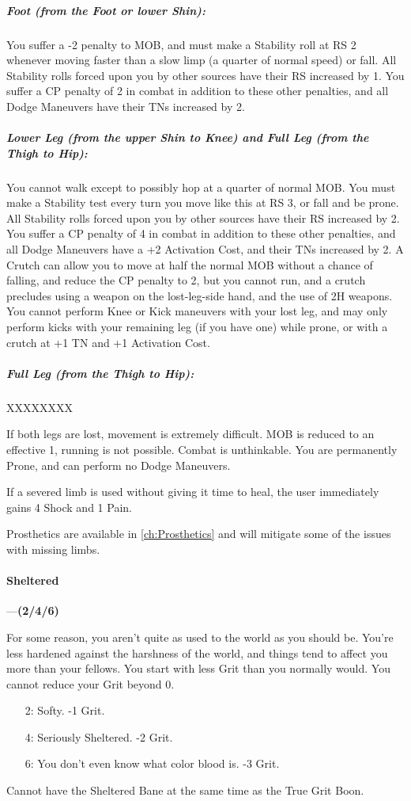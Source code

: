 \documentclass[oneside,11pt,english]{book}
\begin{document}
\vspace*{-10pt}\subparagraph*{Foot (from the Foot or lower Shin):}
You suffer a -2 penalty to MOB, and must make a Stability roll at RS 2 whenever moving faster 
than a slow limp (a quarter of normal speed) or fall. All Stability rolls forced upon you by other 
sources have their RS increased by 1. You suffer a CP penalty of 2 in combat in addition to these 
other penalties, and all Dodge Maneuvers have their TNs increased by 2. 
\vspace*{-10pt}\subparagraph*{Lower Leg (from the upper Shin to Knee) and Full Leg (from the Thigh to Hip):}
You cannot walk except to possibly hop at a quarter of normal MOB. You must make a Stability 
test every turn you move like this at RS 3, or fall and be prone. All Stability rolls forced upon you 
by other sources have their RS increased by 2. You suffer a CP penalty of 4 in combat in addition 
to these other penalties, and all Dodge Maneuvers have a +2 Activation Cost, and their TNs 
increased by 2. A Crutch can allow you to move at half the normal MOB without a chance of 
falling, and reduce the CP penalty to 2, but you cannot run, and a crutch precludes using a 
weapon on the lost-leg-side hand, and the use of 2H weapons. You cannot perform Knee or Kick 
maneuvers with your lost leg, and may only perform kicks with your remaining leg (if you have 
one) while prone, or with a crutch at +1 TN and +1 Activation Cost. 
\vspace*{-10pt}\subparagraph*{Full Leg (from the Thigh to Hip):}
XXXXXXXX

If both legs are lost, movement is extremely difficult. MOB is reduced to an effective 1, running 
is not possible. Combat is unthinkable. You are permanently Prone, and can perform no Dodge 
Maneuvers. 


If a severed limb is used without giving it time to heal, the user immediately gains 4 Shock and 1 Pain.


Prosthetics are available in \autoref{ch:Prosthetics} and will mitigate some of the issues with missing limbs.
\paragraph{\label{bane:Sheltered}Sheltered}---\quad\textbf{(2/4/6) }\par
For some reason, you aren’t quite as used to the world as you should be. You’re less hardened against the 
harshness of the world, and things tend to affect you more than your fellows. You start with less Grit than 
you normally would. You cannot reduce your Grit beyond 0. 
\begin{itemize}
	\item [2:] Softy. -1 Grit.
	\item [4:] Seriously Sheltered. -2 Grit.
	\item [6:]You don’t even know what color blood is. -3 Grit.
\end{itemize}
Cannot have the Sheltered Bane at the same time as the True Grit Boon. 
\end{document}
